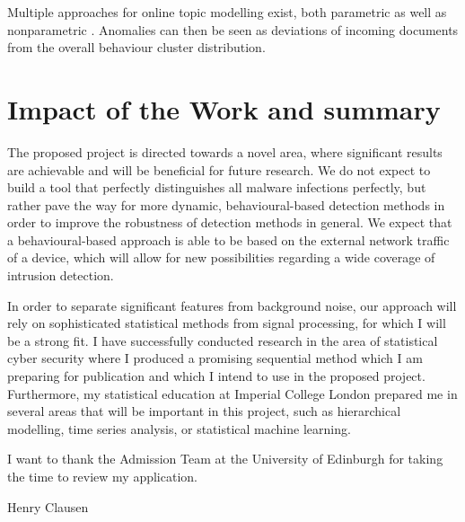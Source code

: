 \documentclass[a4paper,12pt,twoside]{report}
\begin{document}
Multiple approaches for online topic modelling exist, both parametric \cite{NIPS2010_3902} as well as nonparametric \cite{wang2011online}. Anomalies can then be seen as deviations of incoming documents from the overall behaviour cluster distribution.

\section{Impact of the Work and summary}

The proposed project is directed towards a novel area, where significant results are achievable and will be beneficial for future research. We do not expect to build a tool that perfectly distinguishes all malware infections perfectly, but rather pave the way for more dynamic, behavioural-based detection methods in order to improve the robustness of detection methods in general. We expect that a behavioural-based approach is able to be based on the external network traffic of a device, which will allow for new possibilities regarding a wide coverage of intrusion detection. 

In order to separate significant features from background noise, our approach will rely on sophisticated statistical methods from signal processing, for which I will be a strong fit. I have successfully conducted research in the area of statistical cyber security where I produced a promising sequential method which I am preparing for publication and which I intend to use in the proposed project. Furthermore, my statistical education at Imperial College London prepared me in several areas that will be important in this project, such as hierarchical modelling, time series analysis, or statistical machine learning. 

\vspace{2cm}

\noindent I want to thank the Admission Team at the University of Edinburgh for taking the time to review my application.

\vspace{0.6cm}
\noindent Henry Clausen
\pagebreak



\end{document}

